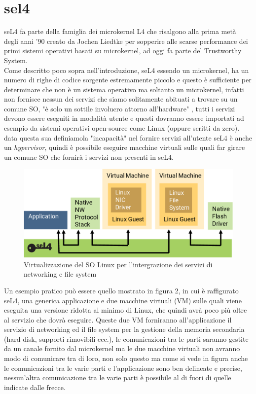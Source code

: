 \chapter{sel4}
seL4 fa parte della famiglia dei microkernel L4 che risalgono alla prima metà degli anni '90 creato da Jochen Liedtke per sopperire alle scarse performance dei primi sistemi operativi basati su microkernel, ad oggi fa parte del Trustworthy System.\\
Come descritto poco sopra nell'introduzione, seL4 essendo un microkernel, ha un numero di righe di codice sorgente estremamente piccolo e questo è sufficiente per determinare che non è un sistema operativo ma soltanto un microkernel, infatti non fornisce nessun dei servizi che siamo solitamente abituati a trovare su un comune SO, "è solo un sottile involucro attorno all'hardware" \cite{sel4-whitepaper}, tutti i servizi devono essere eseguiti in modalità utente e questi dovranno essere importati ad esempio da sistemi operativi open-source come Linux (oppure scritti da zero). data questa sua definiamola "incapacità" nel fornire servizi all'utente seL4 è anche un \textit{hypervisor}, quindi è possibile eseguire macchine virtuali sulle quali far girare un comune SO che fornirà i servizi non presenti in seL4.
\begin{figure}[h]
  \includegraphics[width=\linewidth]{img/seL4Hypervisor.png}
  \caption{Virtualizzazione del SO Linux per l'intergrazione dei servizi di networking e file system}
  \label{fig:MonolithicVSmicrokernel}
\end{figure}

Un esempio pratico può essere quello mostrato in figura 2, in cui è raffigurato seL4, una generica applicazione e due macchine virtuali (VM) sulle quali viene eseguita una versione ridotta al minimo di Linux, che quindi avrà poco più oltre al servizio che dovrà eseguire.
Queste due VM forniranno all'applicazione il servizio di networking ed il file system per la gestione della memoria secondaria (hard disk, supporti rimovibili ecc.), le comunicazioni tra le parti saranno gestite da un canale fornito dal microkernel ma le due macchine virtuali non avranno modo di comunicare tra di loro, non solo questo ma come si vede in figura anche le comunicazioni tra le varie parti e l'applicazione sono ben delineate e precise, nessun'altra comunicazione tra le varie parti è possibile al di fuori di quelle indicate dalle frecce.

